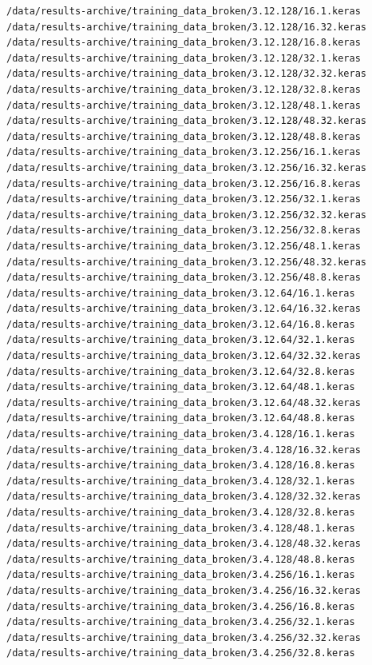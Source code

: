\documentclass[12pt]{article}
\begin{document}
\begin{lstlisting}[style=logstyle, caption={List of failed trained models. See \ref{issues}}, label={lst:model-list}]
/data/results-archive/training_data_broken/3.12.128/16.1.keras
/data/results-archive/training_data_broken/3.12.128/16.32.keras
/data/results-archive/training_data_broken/3.12.128/16.8.keras
/data/results-archive/training_data_broken/3.12.128/32.1.keras
/data/results-archive/training_data_broken/3.12.128/32.32.keras
/data/results-archive/training_data_broken/3.12.128/32.8.keras
/data/results-archive/training_data_broken/3.12.128/48.1.keras
/data/results-archive/training_data_broken/3.12.128/48.32.keras
/data/results-archive/training_data_broken/3.12.128/48.8.keras
/data/results-archive/training_data_broken/3.12.256/16.1.keras
/data/results-archive/training_data_broken/3.12.256/16.32.keras
/data/results-archive/training_data_broken/3.12.256/16.8.keras
/data/results-archive/training_data_broken/3.12.256/32.1.keras
/data/results-archive/training_data_broken/3.12.256/32.32.keras
/data/results-archive/training_data_broken/3.12.256/32.8.keras
/data/results-archive/training_data_broken/3.12.256/48.1.keras
/data/results-archive/training_data_broken/3.12.256/48.32.keras
/data/results-archive/training_data_broken/3.12.256/48.8.keras
/data/results-archive/training_data_broken/3.12.64/16.1.keras
/data/results-archive/training_data_broken/3.12.64/16.32.keras
/data/results-archive/training_data_broken/3.12.64/16.8.keras
/data/results-archive/training_data_broken/3.12.64/32.1.keras
/data/results-archive/training_data_broken/3.12.64/32.32.keras
/data/results-archive/training_data_broken/3.12.64/32.8.keras
/data/results-archive/training_data_broken/3.12.64/48.1.keras
/data/results-archive/training_data_broken/3.12.64/48.32.keras
/data/results-archive/training_data_broken/3.12.64/48.8.keras
/data/results-archive/training_data_broken/3.4.128/16.1.keras
/data/results-archive/training_data_broken/3.4.128/16.32.keras
/data/results-archive/training_data_broken/3.4.128/16.8.keras
/data/results-archive/training_data_broken/3.4.128/32.1.keras
/data/results-archive/training_data_broken/3.4.128/32.32.keras
/data/results-archive/training_data_broken/3.4.128/32.8.keras
/data/results-archive/training_data_broken/3.4.128/48.1.keras
/data/results-archive/training_data_broken/3.4.128/48.32.keras
/data/results-archive/training_data_broken/3.4.128/48.8.keras
/data/results-archive/training_data_broken/3.4.256/16.1.keras
/data/results-archive/training_data_broken/3.4.256/16.32.keras
/data/results-archive/training_data_broken/3.4.256/16.8.keras
/data/results-archive/training_data_broken/3.4.256/32.1.keras
/data/results-archive/training_data_broken/3.4.256/32.32.keras
/data/results-archive/training_data_broken/3.4.256/32.8.keras

\end{lstlisting}
\end{document}
